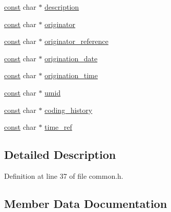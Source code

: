 \begin{DoxyCompactItemize}
\item 
\hyperlink{getopt1_8c_a2c212835823e3c54a8ab6d95c652660e}{const} char $\ast$ \hyperlink{struct_m_e_t_a_d_a_t_a___i_n_f_o_aa42bf600c20f3cc25fe8498238f58ca8}{description}
\item 
\hyperlink{getopt1_8c_a2c212835823e3c54a8ab6d95c652660e}{const} char $\ast$ \hyperlink{struct_m_e_t_a_d_a_t_a___i_n_f_o_a7d7ffd7a4dc38f5182ce554f9f832ad1}{originator}
\item 
\hyperlink{getopt1_8c_a2c212835823e3c54a8ab6d95c652660e}{const} char $\ast$ \hyperlink{struct_m_e_t_a_d_a_t_a___i_n_f_o_acf0ac532d28201f645a2b77396924260}{originator\+\_\+reference}
\item 
\hyperlink{getopt1_8c_a2c212835823e3c54a8ab6d95c652660e}{const} char $\ast$ \hyperlink{struct_m_e_t_a_d_a_t_a___i_n_f_o_a1c51ce50c4f744680d2fe554f21c0fe2}{origination\+\_\+date}
\item 
\hyperlink{getopt1_8c_a2c212835823e3c54a8ab6d95c652660e}{const} char $\ast$ \hyperlink{struct_m_e_t_a_d_a_t_a___i_n_f_o_acf9e627834e270f8db2ad94423433913}{origination\+\_\+time}
\item 
\hyperlink{getopt1_8c_a2c212835823e3c54a8ab6d95c652660e}{const} char $\ast$ \hyperlink{struct_m_e_t_a_d_a_t_a___i_n_f_o_a0f44e89558197c54484713444a5cf52d}{umid}
\item 
\hyperlink{getopt1_8c_a2c212835823e3c54a8ab6d95c652660e}{const} char $\ast$ \hyperlink{struct_m_e_t_a_d_a_t_a___i_n_f_o_a322bfe68acad716599729999034fbbec}{coding\+\_\+history}
\item 
\hyperlink{getopt1_8c_a2c212835823e3c54a8ab6d95c652660e}{const} char $\ast$ \hyperlink{struct_m_e_t_a_d_a_t_a___i_n_f_o_a1f5f865f4b9921c58af66e6b2110b92f}{time\+\_\+ref}
\end{DoxyCompactItemize}


\subsection{Detailed Description}


Definition at line 37 of file common.\+h.



\subsection{Member Data Documentation}
